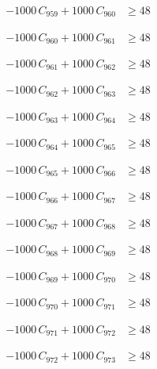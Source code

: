 \documentclass[a4paper,11pt]{article}
\begin{document}
\begin{align}
-1000\,C_{959} + 1000\,C_{960} &\geq 48 \nonumber
\end{align}

\begin{align}
-1000\,C_{960} + 1000\,C_{961} &\geq 48 \nonumber
\end{align}

\begin{align}
-1000\,C_{961} + 1000\,C_{962} &\geq 48 \nonumber
\end{align}

\begin{align}
-1000\,C_{962} + 1000\,C_{963} &\geq 48 \nonumber
\end{align}

\begin{align}
-1000\,C_{963} + 1000\,C_{964} &\geq 48 \nonumber
\end{align}

\begin{align}
-1000\,C_{964} + 1000\,C_{965} &\geq 48 \nonumber
\end{align}

\begin{align}
-1000\,C_{965} + 1000\,C_{966} &\geq 48 \nonumber
\end{align}

\begin{align}
-1000\,C_{966} + 1000\,C_{967} &\geq 48 \nonumber
\end{align}

\begin{align}
-1000\,C_{967} + 1000\,C_{968} &\geq 48 \nonumber
\end{align}

\begin{align}
-1000\,C_{968} + 1000\,C_{969} &\geq 48 \nonumber
\end{align}

\begin{align}
-1000\,C_{969} + 1000\,C_{970} &\geq 48 \nonumber
\end{align}

\begin{align}
-1000\,C_{970} + 1000\,C_{971} &\geq 48 \nonumber
\end{align}

\begin{align}
-1000\,C_{971} + 1000\,C_{972} &\geq 48 \nonumber
\end{align}

\begin{align}
-1000\,C_{972} + 1000\,C_{973} &\geq 48 \nonumber
\end{align}
\end{document}
